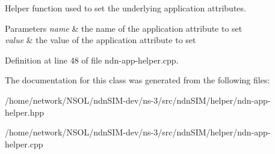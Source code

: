Helper function used to set the underlying application attributes. 


\begin{DoxyParams}{Parameters}
{\em name} & the name of the application attribute to set \\
\hline
{\em value} & the value of the application attribute to set \\
\hline
\end{DoxyParams}


Definition at line 48 of file ndn-\/app-\/helper.\+cpp.



The documentation for this class was generated from the following files\+:\begin{DoxyCompactItemize}
\item 
/home/network/\+N\+S\+O\+L/ndn\+S\+I\+M-\/dev/ns-\/3/src/ndn\+S\+I\+M/helper/ndn-\/app-\/helper.\+hpp\item 
/home/network/\+N\+S\+O\+L/ndn\+S\+I\+M-\/dev/ns-\/3/src/ndn\+S\+I\+M/helper/ndn-\/app-\/helper.\+cpp\end{DoxyCompactItemize}
